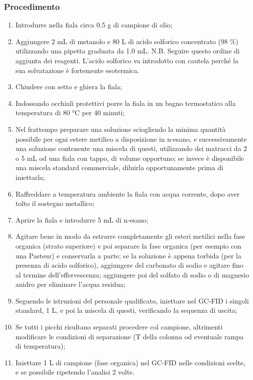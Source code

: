 \subsubsection{Procedimento}
\begin{enumerate}
\item Introdurre nella fiala circa 0.5 g di campione di olio;
\item Aggiungere 2 mL di metanolo e 80 \mu L di acido solforico concentrato (98 \%) utilizzando una pipetta graduata da 1.0 mL. N.B. Seguire questo ordine di aggiunta dei reagenti. L'acido solforico va introdotto con cautela perché la sua solvatazione è fortemente esotermica.
\item Chiudere con setto e ghiera la fiala;
\item Indossando occhiali protettivi porre la fiala in un bagno termostatico alla temperatura di 80 °C per 40 minuti;
\item Nel frattempo preparare una soluzione sciogliendo la minima quantità possibile per ogni estere metilico a disposizione in n-esano, e successivamente una soluzione contenente una miscela di questi, utilizzando dei matracci da 2 o 5 mL od una fiala con tappo, di volume opportuno; se invece è disponibile una miscela standard commerciale, diluirla opportunamente prima di iniettarla;
\item Raffreddare a temperatura ambiente la fiala con acqua corrente, dopo aver tolto il sostegno metallico;
\item Aprire la fiala e introdurre 5 mL di n-esano;
\item Agitare bene in modo da estrarre completamente gli esteri metilici nella fase organica (strato superiore) e poi separare la fase organica (per esempio con una Pasteur) e conservarla a parte; se la soluzione è appena torbida (per la presenza di acido solforico), aggiungere del carbonato di sodio e agitare fino al termine dell'effervescenza; aggiungere poi del solfato di sodio o di magnesio anidro per eliminare l'acqua residua;
\item Seguendo le istruzioni del personale qualificato, iniettare nel GC-FID i singoli standard, 1 \mu L, e poi la miscela di questi, verificando la sequenza di uscita;
\item Se tutti i picchi risultano separati procedere col campione, altrimenti modificare le condizioni di separazione (T della colonna od eventuale rampa di temperatura);
\item Iniettare 1 \mu L di campione (fase organica) nel GC-FID nelle condizioni scelte, e se possibile ripetendo l'analisi 2 volte.
\end{enumerate}

